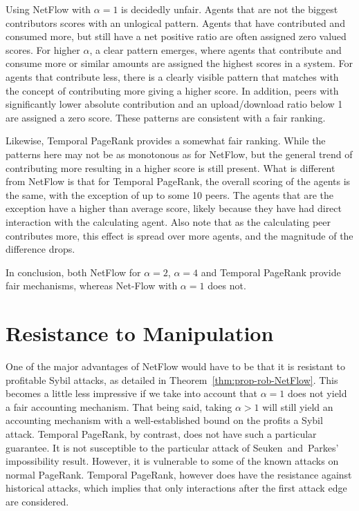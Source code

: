 \documentclass[a4paper,11pt]{book}
\theoremstyle{definition}
\begin{document}
Using NetFlow with $\alpha=1$ is decidedly unfair. 
Agents that are not the biggest contributors scores with an unlogical pattern.
Agents that have contributed and consumed more, but still have a net positive ratio are often assigned
zero valued scores. For higher $\alpha$, a clear pattern emerges, where agents that contribute
and consume more or similar amounts are assigned the highest scores in a system. For agents
that contribute less, there is a clearly visible pattern that matches with the concept of 
contributing more giving a higher score. In addition, peers with significantly lower absolute contribution
and an upload/download ratio below 1 are assigned a zero score. These patterns are consistent with a fair
ranking.

Likewise, Temporal PageRank provides a somewhat fair ranking. While the patterns here may not be as
monotonous as for NetFlow, but the general trend of contributing more resulting in a higher score
is still present. What is different from NetFlow is that for Temporal PageRank, the overall
scoring of the agents is the same, with the exception of up to some 10 peers. The agents that are
the exception have a higher than average score, likely because they have had direct interaction with
the calculating agent. Also note that as the calculating peer contributes more, this effect is spread
over more agents, and the magnitude of the difference drops. 

In conclusion, both NetFlow for $\alpha=2$, $\alpha=4$ and Temporal PageRank provide fair mechanisms, whereas
Net-Flow with $\alpha=1$ does not.

\section{Resistance to Manipulation}

One of the major advantages of NetFlow would have to be that it is resistant to profitable Sybil attacks,
as detailed in Theorem~\ref{thm:prop-rob-NetFlow}. This becomes a little less impressive if we
take into account that $\alpha=1$ does not yield a fair accounting mechanism. That being said, taking
$\alpha > 1$ will still yield an accounting mechanism with a well-established bound on the profits
a Sybil attack. Temporal PageRank, by contrast, does not have such a particular guarantee. It is not
susceptible to the particular attack of Seuken~and~Parkes' impossibility result. However, it is
vulnerable to some of the known attacks on normal PageRank. Temporal PageRank, however does have
the resistance against historical attacks, which implies that only interactions after the
first attack edge are considered.
\end{document}
